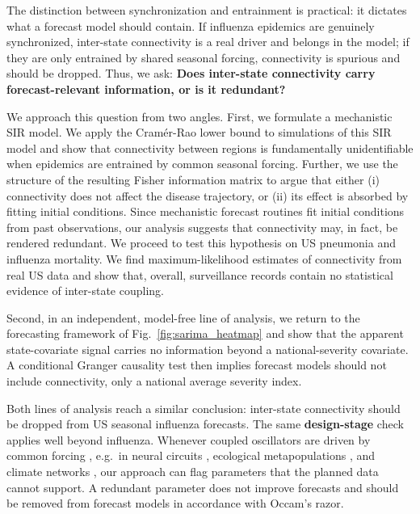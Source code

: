 \documentclass[9pt,twocolumn,twoside]{pnas-new}
\begin{document}
The distinction between synchronization and entrainment is practical:
it dictates what a forecast model should contain. If influenza
epidemics are genuinely synchronized, inter-state connectivity is a
real driver and belongs in the model; if they are only entrained by
shared seasonal forcing, connectivity is spurious and should be
dropped. Thus, we ask: \textbf{Does inter-state connectivity carry
  forecast-relevant information, or is it redundant?}


We approach this question from two angles. First, we formulate a
mechanistic SIR model. We apply the Cram\'er-Rao lower bound to
simulations of this SIR model and show that connectivity between regions
is fundamentally unidentifiable when epidemics are entrained by
common seasonal forcing. Further, we use the structure of the
resulting Fisher information matrix to argue that either (i)
connectivity does not affect the disease trajectory, or (ii) its
effect is absorbed by fitting initial conditions. Since mechanistic
forecast routines fit initial conditions from past observations, our
analysis suggests that connectivity may, in fact, be rendered
redundant. We proceed to test
this hypothesis on US pneumonia and influenza mortality. We find
maximum-likelihood estimates of connectivity from real US data and
show that, overall, surveillance records contain no statistical
evidence of inter-state coupling.

Second, in an independent, model-free line of analysis, we return to
the forecasting framework of Fig.~\ref{fig:sarima_heatmap} and show that
the apparent state-covariate signal carries no information beyond a
national-severity covariate. A conditional Granger causality test
\cite{granger1969, geweke1984} then implies forecast models should not
include connectivity, only a national average severity index.


Both lines of analysis reach a similar conclusion: inter-state
connectivity should be dropped from US seasonal influenza
forecasts. The same \textbf{design-stage} check applies well beyond
influenza. Whenever coupled oscillators are driven by common forcing
\citep{pikovsky2001}, e.g.~in neural circuits \citep{reid2019,
  friston2011}, ecological metapopulations \citep{bjornstad1999,
  grenfell1998}, and climate networks \citep{tsonis2004architecture},
our approach can flag parameters that the planned data cannot
support. A redundant parameter does not improve forecasts and should be
removed from forecast models in accordance with Occam's razor.
\end{document}
